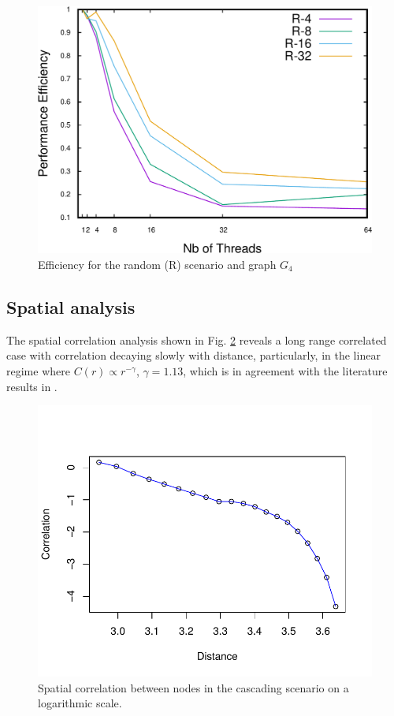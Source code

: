 \begin{figure}
\centering
\includegraphics[scale=0.35]{bench/generated/efficiency-r-4-crop.pdf}
\caption{Efficiency for the random (R) scenario and graph $G_4$}
\label{fig:effr4}
\end{figure}



\subsection{Spatial analysis}
The spatial correlation analysis shown in Fig. \ref{fig:correlation} reveals a long range correlated case with correlation decaying slowly with distance, particularly, in the linear regime where $C(r) \propto r^{-\gamma} $, $\gamma = 1.13$, which is in agreement with the literature results in \cite{DaqingAl14}.

\begin{figure}
\centering
\includegraphics[scale=0.65]{bench/fixed/correlation-eps-converted-to.pdf}
\caption{Spatial correlation between nodes in the cascading scenario on a logarithmic scale.}
\label{fig:correlation}
\end{figure}




